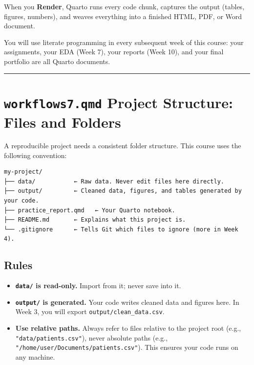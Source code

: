 \documentclass[
  letterpaper,
  DIV=11,
  numbers=noendperiod,
  oneside]{scrreprt}
\providecommand{\tightlist}{%
  \setlength{\itemsep}{0pt}\setlength{\parskip}{0pt}}
\begin{document}
When you \textbf{Render}, Quarto runs every code chunk, captures the
output (tables, figures, numbers), and weaves everything into a finished
HTML, PDF, or Word document.

You will use literate programming in every subsequent week of this
course: your assignments, your EDA (Week 7), your reports (Week 10), and
your final portfolio are all Quarto documents.

\begin{center}\rule{0.5\linewidth}{0.5pt}\end{center}

\section*{\texorpdfstring{\texttt{workflows7.qmd} Project Structure:
Files and
Folders}{workflows7.qmd Project Structure: Files and Folders}}\label{workflows7.qmd-project-structure-files-and-folders}


A reproducible project needs a consistent folder structure. This course
uses the following convention:

\begin{verbatim}
my-project/
├── data/           ← Raw data. Never edit files here directly.
├── output/         ← Cleaned data, figures, and tables generated by your code.
├── practice_report.qmd   ← Your Quarto notebook.
├── README.md       ← Explains what this project is.
└── .gitignore      ← Tells Git which files to ignore (more in Week 4).
\end{verbatim}

\subsection*{Rules}\label{rules}

\begin{itemize}
\tightlist
\item
  \textbf{\texttt{data/} is read-only.} Import from it; never save into
  it.
\item
  \textbf{\texttt{output/} is generated.} Your code writes cleaned data
  and figures here. In Week 3, you will export
  \texttt{output/clean\_data.csv}.
\item
  \textbf{Use relative paths.} Always refer to files relative to the
  project root (e.g., \texttt{"data/patients.csv"}), never absolute
  paths (e.g., \texttt{"/home/user/Documents/patients.csv"}). This
  ensures your code runs on any machine.
\end{itemize}
\end{document}
